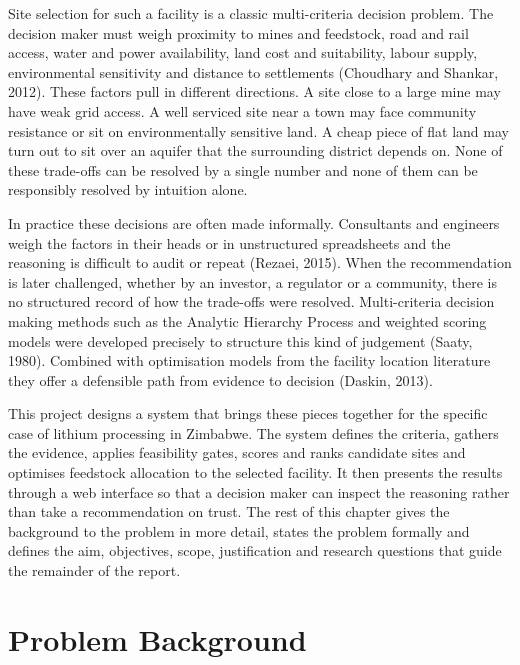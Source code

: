 \documentclass[12pt,a4paper]{report}
\begin{document}
Site selection for such a facility is a classic multi-criteria
decision problem. The decision maker must weigh proximity to mines and
feedstock, road and rail access, water and power availability, land
cost and suitability, labour supply, environmental sensitivity and
distance to settlements (Choudhary and Shankar, 2012). These factors
pull in different directions. A site close to a large mine may have
weak grid access. A well serviced site near a town may face community
resistance or sit on environmentally sensitive land. A cheap piece of
flat land may turn out to sit over an aquifer that the surrounding
district depends on. None of these trade-offs can be resolved by a
single number and none of them can be responsibly resolved by intuition
alone.

In practice these decisions are often made informally. Consultants and
engineers weigh the factors in their heads or in unstructured
spreadsheets and the reasoning is difficult to audit or repeat
(Rezaei, 2015). When the recommendation is later challenged, whether by
an investor, a regulator or a community, there is no structured record
of how the trade-offs were resolved. Multi-criteria decision making
methods such as the Analytic Hierarchy Process and weighted scoring
models were developed precisely to structure this kind of judgement
(Saaty, 1980). Combined with optimisation models from the facility
location literature they offer a defensible path from evidence to
decision (Daskin, 2013).

This project designs a system that brings these pieces together for
the specific case of lithium processing in Zimbabwe. The system defines
the criteria, gathers the evidence, applies feasibility gates, scores
and ranks candidate sites and optimises feedstock allocation to the
selected facility. It then presents the results through a web interface
so that a decision maker can inspect the reasoning rather than take a
recommendation on trust. The rest of this chapter gives the background
to the problem in more detail, states the problem formally and defines
the aim, objectives, scope, justification and research questions that
guide the remainder of the report.

\section{Problem Background}
\end{document}
